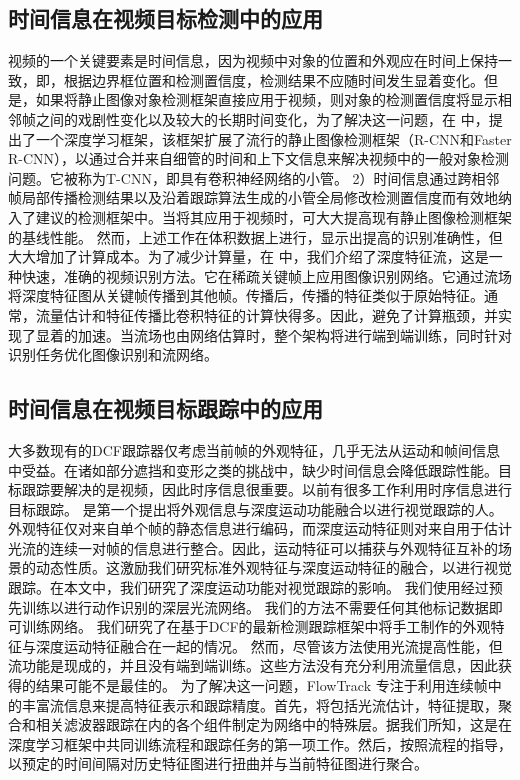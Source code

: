 \subsection{时间信息在视频目标检测中的应用}
视频的一个关键要素是时间信息，因为视频中对象的位置和外观应在时间上保持一致，即，根据边界框位置和检测置信度，检测结果不应随时间发生显着变化。但是，如果将静止图像对象检测框架直接应用于视频，则对象的检测置信度将显示相邻帧之间的戏剧性变化以及较大的长期时间变化，为了解决这一问题，在 \cite{TCNN} 中，提出了一个深度学习框架，该框架扩展了流行的静止图像检测框架（R-CNN和Faster R-CNN），以通过合并来自细管的时间和上下文信息来解决视频中的一般对象检测问题。它被称为T-CNN，即具有卷积神经网络的小管。 2）时间信息通过跨相邻帧局部传播检测结果以及沿着跟踪算法生成的小管全局修改检测置信度而有效地纳入了建议的检测框架中。当将其应用于视频时，可大大提高现有静止图像检测框架的基线性能。%
然而，上述工作在体积数据上进行，显示出提高的识别准确性，但大大增加了计算成本。为了减少计算量，在 \cite{DeepFeature} 中，我们介绍了深度特征流，这是一种快速，准确的视频识别方法。它在稀疏关键帧上应用图像识别网络。它通过流场将深度特征图从关键帧传播到其他帧。传播后，传播的特征类似于原始特征。通常，流量估计和特征传播比卷积特征的计算快得多。因此，避免了计算瓶颈，并实现了显着的加速。当流场也由网络估算时，整个架构将进行端到端训练，同时针对识别任务优化图像识别和流网络。%
\subsection{时间信息在视频目标跟踪中的应用}
大多数现有的DCF跟踪器仅考虑当前帧的外观特征，几乎无法从运动和帧间信息中受益。在诸如部分遮挡和变形之类的挑战中，缺少时间信息会降低跟踪性能。目标跟踪要解决的是视频，因此时序信息很重要。以前有很多工作利用时序信息进行目标跟踪。
\cite{DeepMotion} 是第一个提出将外观信息与深度运动功能融合以进行视觉跟踪的人。外观特征仅对来自单个帧的静态信息进行编码，而深度运动特征则对来自用于估计光流的连续一对帧的信息进行整合。因此，运动特征可以捕获与外观特征互补的场景的动态性质。这激励我们研究标准外观特征与深度运动特征的融合，以进行视觉跟踪。在本文中，我们研究了深度运动功能对视觉跟踪的影响。 我们使用经过预先训练以进行动作识别的深层光流网络。 我们的方法不需要任何其他标记数据即可训练网络。 我们研究了在基于DCF的最新检测跟踪框架中将手工制作的外观特征与深度运动特征融合在一起的情况。
然而，尽管该方法使用光流提高性能，但流功能是现成的，并且没有端到端训练。这些方法没有充分利用流量信息，因此获得的结果可能不是最佳的。
为了解决这一问题，FlowTrack \cite{FlowTrack} 专注于利用连续帧中的丰富流信息来提高特征表示和跟踪精度。首先，将包括光流估计，特征提取，聚合和相关滤波器跟踪在内的各个组件制定为网络中的特殊层。据我们所知，这是在深度学习框架中共同训练流程和跟踪任务的第一项工作。然后，按照流程的指导，以预定的时间间隔对历史特征图进行扭曲并与当前特征图进行聚合。

